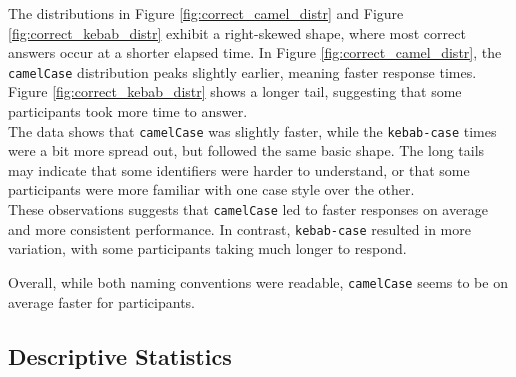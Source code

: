 \documentclass[unicode,11pt,a4paper,oneside,numbers=endperiod,openany]{scrartcl}
\begin{document}
The distributions in Figure \ref{fig:correct_camel_distr} and Figure \ref{fig:correct_kebab_distr} exhibit a right-skewed shape, where most correct answers occur at a shorter elapsed time. In Figure \ref{fig:correct_camel_distr}, the \texttt{camelCase} distribution peaks slightly earlier, meaning faster response times. Figure \ref{fig:correct_kebab_distr} shows a longer tail, suggesting that some participants took more time to answer. \\
The data shows that \texttt{camelCase} was slightly faster, while the \texttt{kebab-case} times were a bit more spread out, but followed the same basic shape. The long tails may indicate that some identifiers were harder to understand, or that some participants were more familiar with one case style over the other. \\

These observations suggests that \texttt{camelCase} led to faster responses on average and more consistent performance. In contrast, \texttt{kebab-case} resulted in more variation, with some participants taking much longer to respond.

Overall, while both naming conventions were readable, \texttt{camelCase} seems to be on average faster for participants.

\newpage

\subsection{Descriptive Statistics}

\begin{table}[h!]
    \centering
    \caption{Descriptive Statistics of All Participants}
    \label{tab:all}
\end{table}
\end{document}
